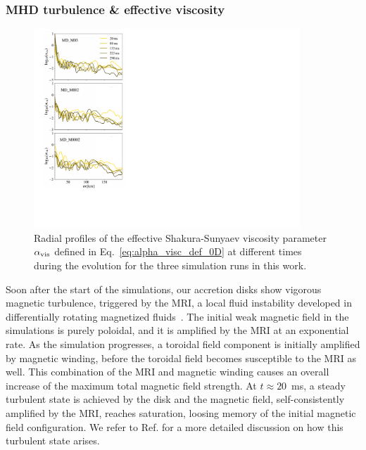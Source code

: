 \subsubsection{MHD turbulence \& effective viscosity}
\label{sec:viscosity}


\begin{figure}[t]
\centering
  \includegraphics[width=10cm]{figures/kilonova/alpha-viscosity.pdf}
 \caption{Radial profiles of the effective Shakura-Sunyaev viscosity parameter $\alpha_{\rm vis}$ defined in Eq.~\eqref{eq:alpha_visc_def_0D} at different times during the evolution for the three simulation runs in this work. \label{fig:alpha-viscosity}}
\vspace{5mm}
\end{figure}

Soon after the start of the simulations, our accretion disks show vigorous magnetic turbulence, triggered by the MRI, a local fluid instability developed in differentially rotating magnetized fluids~\cite{velikhov_notitle_1959,chandrasekhar_stability_1960,balbus_powerful_1991,1998RvMP...70....1B,Balbus:2003xh,armitage_dynamics_2011}. The initial weak magnetic field in the simulations is purely poloidal, and it is amplified by the MRI at an exponential rate. As the simulation progresses, a toroidal field component is initially amplified by magnetic winding, before the toroidal field becomes susceptible to the MRI as well. This combination of the MRI and magnetic winding causes an overall increase of the maximum total magnetic field strength. At $t\approx 20$~ms, a steady turbulent state is achieved by the disk and the magnetic field, self-consistently amplified by the MRI, reaches saturation, loosing memory of the initial magnetic field configuration. We refer to Ref. \cite{siegel_three-dimensional_2018} for a more detailed discussion on how this turbulent state arises.

